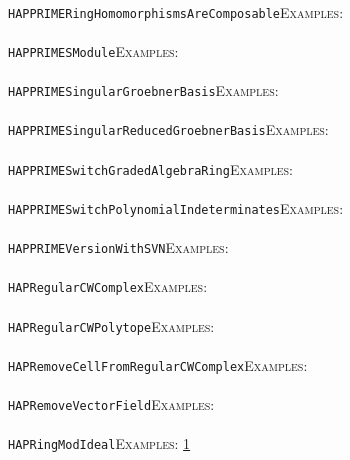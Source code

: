 \documentclass[a4paper,11pt]{report}
\begin{document}
{{ \\
 \texttt{HAPPRIME{\textunderscore}RingHomomorphismsAreComposable}{\nobreakspace}{\nobreakspace}{\nobreakspace}{\nobreakspace}\textsc{Examples:} \\
 \\
 \texttt{HAPPRIME{\textunderscore}SModule}{\nobreakspace}{\nobreakspace}{\nobreakspace}{\nobreakspace}\textsc{Examples:} \\
 \\
 \texttt{HAPPRIME{\textunderscore}SingularGroebnerBasis}{\nobreakspace}{\nobreakspace}{\nobreakspace}{\nobreakspace}\textsc{Examples:} \\
 \\
 \texttt{HAPPRIME{\textunderscore}SingularReducedGroebnerBasis}{\nobreakspace}{\nobreakspace}{\nobreakspace}{\nobreakspace}\textsc{Examples:} \\
 \\
 \texttt{HAPPRIME{\textunderscore}SwitchGradedAlgebraRing}{\nobreakspace}{\nobreakspace}{\nobreakspace}{\nobreakspace}\textsc{Examples:} \\
 \\
 \texttt{HAPPRIME{\textunderscore}SwitchPolynomialIndeterminates}{\nobreakspace}{\nobreakspace}{\nobreakspace}{\nobreakspace}\textsc{Examples:} \\
 \\
 \texttt{HAPPRIME{\textunderscore}VersionWithSVN}{\nobreakspace}{\nobreakspace}{\nobreakspace}{\nobreakspace}\textsc{Examples:} \\
 \\
 \texttt{HAPRegularCWComplex}{\nobreakspace}{\nobreakspace}{\nobreakspace}{\nobreakspace}\textsc{Examples:} \\
 \\
 \texttt{HAPRegularCWPolytope}{\nobreakspace}{\nobreakspace}{\nobreakspace}{\nobreakspace}\textsc{Examples:} \\
 \\
 \texttt{HAPRemoveCellFromRegularCWComplex}{\nobreakspace}{\nobreakspace}{\nobreakspace}{\nobreakspace}\textsc{Examples:} \\
 \\
 \texttt{HAPRemoveVectorField}{\nobreakspace}{\nobreakspace}{\nobreakspace}{\nobreakspace}\textsc{Examples:} \\
 \\
 \texttt{HAPRingModIdeal}{\nobreakspace}{\nobreakspace}{\nobreakspace}{\nobreakspace}\textsc{Examples:} \href{tutorial/chap10.html} {1}{\nobreakspace} \\
 \\
}}
\end{document}
